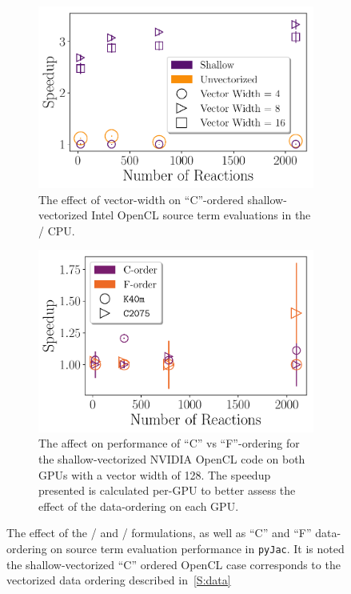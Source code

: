 \documentclass[12pt,number,sort&compress,preprint]{elsarticle}
\begin{document}
\begin{figure}[htbp]
  \\
  \begin{subfigure}[t]{0.48\linewidth}
      \includegraphics[width=\textwidth]{source_vector_width.pdf}
      \caption{The effect of vector-width on ``C''-ordered shallow-vectorized Intel OpenCL source term evaluations in the \avx/ CPU.}
      \label{F:source_vector_width}
  \end{subfigure}
  \hfill
  \begin{subfigure}[t]{0.48\linewidth}
      \includegraphics[width=\textwidth]{source_gpu_cvsf.pdf}
      \caption{The affect on performance of ``C'' vs ``F''-ordering for the shallow-vectorized NVIDIA OpenCL code on both GPUs with a vector width of 128.  The speedup presented is calculated per-GPU to better assess the effect of the data-ordering on each GPU.}
      \label{F:source_gpu_cvsf}
  \end{subfigure}
  \caption{The effect of the \conp/ and \conv/ formulations, as well as ``C'' and ``F'' data-ordering on source term evaluation performance in \texttt{pyJac}.
	   It is noted the shallow-vectorized ``C'' ordered OpenCL case corresponds to the vectorized data ordering described in~\cref{S:data}}
  \label{f:source_permutate}
\end{figure}
\end{document}
